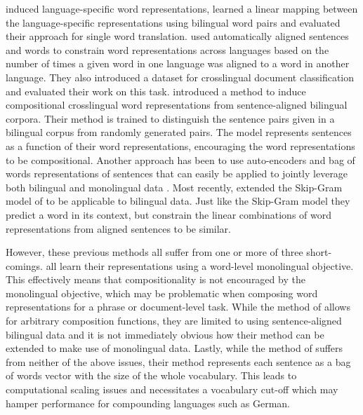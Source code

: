 \documentclass{article} \usepackage{iclr2015,times}
\begin{document}
\citet{mikolov2013mt} induced language-specific word representations,
learned a linear mapping between the language-specific representations using
bilingual word pairs and evaluated their approach for single word translation.
\citet{klementiev2012inducing} used automatically aligned sentences and words
to constrain word representations across languages based on the number of
times a given word in one language was aligned to a word in another language.
They also introduced a dataset for crosslingual document classification and
evaluated their work on this task.
\citet{hermann2014multilingual} introduced a method to
induce compositional crosslingual word representations from sentence-aligned
bilingual corpora. 
Their method is trained to distinguish the sentence pairs given in a
bilingual corpus from randomly generated pairs. 
The model represents sentences as a function of their word representations,
encouraging the word representations to be compositional.
Another approach has been to use auto-encoders and bag of
words representations of sentences that can easily be applied to jointly
leverage both bilingual and monolingual data \citep{chandar2014autoencoder}.
Most recently, \citet{gouws2014bilbowa} extended the Skip-Gram model of
\citet{mikolov2013efficient} to be applicable to bilingual data.
Just like the Skip-Gram model they predict a word in its context,
but constrain the linear combinations of word representations from aligned
sentences to be similar.

However, these previous methods all suffer from one or more of three
short-comings.
\citet{klementiev2012inducing,mikolov2013mt,gouws2014bilbowa} all learn their
representations using a word-level monolingual objective.
This effectively means that compositionality is not encouraged by
the monolingual objective, which may be problematic when composing
word representations for a phrase or document-level task.
While the method of \citet{hermann2014multilingual} allows for arbitrary
composition functions, they are limited to using sentence-aligned bilingual
data and it is not immediately obvious how their method can be extended to
make use of monolingual data.
Lastly, while the method of \citet{chandar2014autoencoder} suffers from
neither of the above issues, their method represents each sentence as
a bag of words vector with the size of the whole vocabulary.
This leads to computational scaling issues and necessitates a vocabulary
cut-off which may hamper performance for compounding languages such as German.
\end{document}
